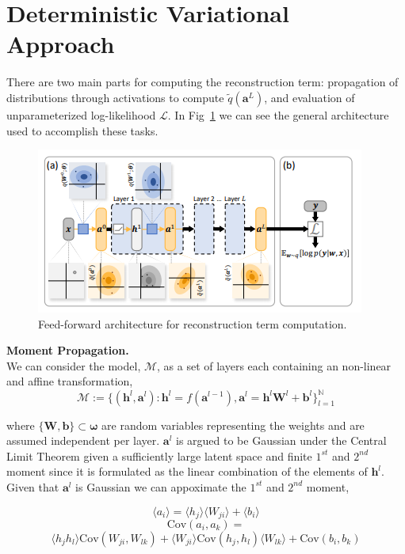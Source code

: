 \section{Deterministic Variational Approach}
There are two main parts for computing the reconstruction term: propagation of distributions through activations to compute $\tilde{q}(\mathbf{a}^L)$, and evaluation of unparameterized log-likelihood $\mathcal{L}$. In Fig~\ref{fig:feed_arch} we can see the general architecture used to accomplish these tasks.

\begin{figure}[H]
\centering
\includegraphics[scale=.5]{fig/dvi-architect-p1.png}
\caption{Feed-forward architecture for reconstruction term computation.}
\label{fig:feed_arch}
\end{figure}

\noindent\textbf{Moment Propagation.} \\
We can consider the model, $\mathcal{M}$, as a set of layers each containing an non-linear and affine transformation,
$$
\mathcal{M} := \{(\bm{h}^l,\bm{a}^l): \bm{h}^l = f(\bm{a}^{l-1}), \bm{a}^l = \bm{h}^l\bm{W}^l + \bm{b}^l\}_{l=1}^{\mathbb{N}}
$$

where $\{\bm{W},\bm{b}\}\subset\bm{\omega}$ are random variables representing the weights and are assumed independent per layer. $\bm{a}^l$ is argued to be Gaussian under the Central Limit Theorem given a sufficiently large latent space and finite $1^{st}$ and $2^{nd}$ moment since it is formulated as the linear combination of the elements of $\bm{h}^l$. Given that $\bm{a}^l$ is Gaussian we can appoximate the $1^{st}$ and $2^{nd}$ moment,

\begin{equation}
\langle a_i\rangle = \langle h_j\rangle\langle W_{ji}\rangle + \langle b_i\rangle
\end{equation}
$$
\text{Cov}(a_i,a_k) = 
$$
\begin{equation}
\langle h_jh_l\rangle\text{Cov}(W_{ji},W_{lk})+ \langle W_{ji}\rangle\text{Cov}(h_j,h_l)\langle W_{lk}\rangle + \text{Cov}(b_i,b_k)
\end{equation}

